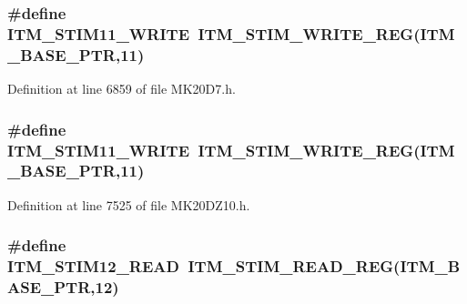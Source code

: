 \subsubsection[{\texorpdfstring{I\+T\+M\+\_\+\+S\+T\+I\+M11\+\_\+\+W\+R\+I\+TE}{ITM_STIM11_WRITE}}]{\setlength{\rightskip}{0pt plus 5cm}\#define I\+T\+M\+\_\+\+S\+T\+I\+M11\+\_\+\+W\+R\+I\+TE~{\bf I\+T\+M\+\_\+\+S\+T\+I\+M\+\_\+\+W\+R\+I\+T\+E\+\_\+\+R\+EG}({\bf I\+T\+M\+\_\+\+B\+A\+S\+E\+\_\+\+P\+TR},11)}\hypertarget{group___i_t_m___register___accessor___macros_ga2b6f1a25e7ac17786baf3b401c94a1d9}{}\label{group___i_t_m___register___accessor___macros_ga2b6f1a25e7ac17786baf3b401c94a1d9}


Definition at line 6859 of file M\+K20\+D7.\+h.

\subsubsection[{\texorpdfstring{I\+T\+M\+\_\+\+S\+T\+I\+M11\+\_\+\+W\+R\+I\+TE}{ITM_STIM11_WRITE}}]{\setlength{\rightskip}{0pt plus 5cm}\#define I\+T\+M\+\_\+\+S\+T\+I\+M11\+\_\+\+W\+R\+I\+TE~{\bf I\+T\+M\+\_\+\+S\+T\+I\+M\+\_\+\+W\+R\+I\+T\+E\+\_\+\+R\+EG}({\bf I\+T\+M\+\_\+\+B\+A\+S\+E\+\_\+\+P\+TR},11)}\hypertarget{group___i_t_m___register___accessor___macros_ga2b6f1a25e7ac17786baf3b401c94a1d9}{}\label{group___i_t_m___register___accessor___macros_ga2b6f1a25e7ac17786baf3b401c94a1d9}


Definition at line 7525 of file M\+K20\+D\+Z10.\+h.

\subsubsection[{\texorpdfstring{I\+T\+M\+\_\+\+S\+T\+I\+M12\+\_\+\+R\+E\+AD}{ITM_STIM12_READ}}]{\setlength{\rightskip}{0pt plus 5cm}\#define I\+T\+M\+\_\+\+S\+T\+I\+M12\+\_\+\+R\+E\+AD~{\bf I\+T\+M\+\_\+\+S\+T\+I\+M\+\_\+\+R\+E\+A\+D\+\_\+\+R\+EG}({\bf I\+T\+M\+\_\+\+B\+A\+S\+E\+\_\+\+P\+TR},12)}\hypertarget{group___i_t_m___register___accessor___macros_gabb2b8e4fa01909ba0dda5d7d62bb2b0c}{}\label{group___i_t_m___register___accessor___macros_gabb2b8e4fa01909ba0dda5d7d62bb2b0c}


